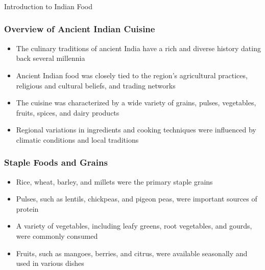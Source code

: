 \begin{frame}[fragile]\frametitle{}
\begin{center}
{\Large Introduction to Indian Food}
\end{center}
\end{frame}

\begin{frame}[fragile]\frametitle{Overview of Ancient Indian Cuisine}
    \begin{itemize}
        \item The culinary traditions of ancient India have a rich and diverse history dating back several millennia
        \item Ancient Indian food was closely tied to the region's agricultural practices, religious and cultural beliefs, and trading networks
        \item The cuisine was characterized by a wide variety of grains, pulses, vegetables, fruits, spices, and dairy products
        \item Regional variations in ingredients and cooking techniques were influenced by climatic conditions and local traditions
    \end{itemize}
\end{frame}

\begin{frame}[fragile]\frametitle{Staple Foods and Grains}
    \begin{itemize}
        \item Rice, wheat, barley, and millets were the primary staple grains
        \item Pulses, such as lentils, chickpeas, and pigeon peas, were important sources of protein
        \item A variety of vegetables, including leafy greens, root vegetables, and gourds, were commonly consumed
        \item Fruits, such as mangoes, berries, and citrus, were available seasonally and used in various dishes
    \end{itemize}
\end{frame}


